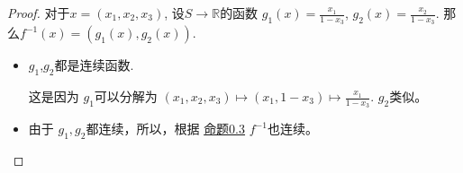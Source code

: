 \documentclass{ctexart}
\theoremstyle{definition}
\begin{document}
\begin{proof}
    对于\(x=(x_1,x_2,x_3)\), 设\(S\to \mathbb{R}\)的函数 \(g_1(x)=\frac{x_1}{1-x_3}\), \(g_2(x)=\frac{x_2}{1-x_3}\). 那么\(f^{-1}(x)=(g_1(x),g_2(x))\).
    \begin{itemize}
        \item \(g_1\),\(g_2\)都是连续函数.
        
        这是因为
            \(g_1\)可以分解为 \((x_1,x_2,x_3)\mapsto (x_1,1-x_3) \mapsto \frac{x_1}{1-x_3} \). \(g_2\)类似。
        \item  由于 \(g_1,g_2\)都连续，所以，根据 \hyperlink{03}{命题0.3} \(f^{-1}\)也连续。
    \end{itemize}
\end{proof}





\end{document}

